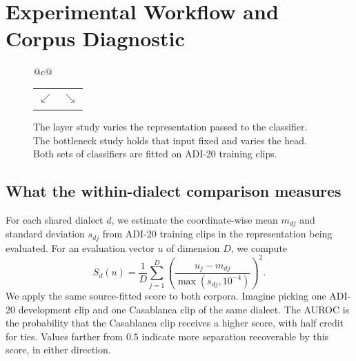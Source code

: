 \documentclass[11pt]{article}
\begin{document}
\clearpage
\section{Experimental Workflow and Corpus Diagnostic}
\label{app:workflow}

\begin{figure}[htbp]
\centering
\setlength{\fboxsep}{7pt}
\setlength{\tabcolsep}{8pt}
\begin{tabular}{@{}c@{}}
  \\[4pt]
  \begin{tabular}{@{}c@{\hspace{0.06\linewidth}}c@{}}
    \(\swarrow\) & \(\searrow\)\\[3pt]
    \fbox{\parbox[t][10.7em][t]{0.40\linewidth}{\centering
      \textbf{Layer study}\\[3pt]
      Individual layers, uniform averages, or learned mixtures\\[3pt]
      \(\downarrow\)\\[2pt]
      Linear classifier\\[3pt]
      \(\downarrow\)\\[2pt]
      ADI-20 dev and balanced Casablanca development
    }}
    &
    \fbox{\parbox[t][10.7em][t]{0.40\linewidth}{\centering
      \textbf{Bottleneck study}\\[3pt]
      Uniform average of blocks 6--18\\[3pt]
      \(\downarrow\)\\[2pt]
      MLP, deterministic, or VIB head\\[3pt]
      \(\downarrow\)\\[2pt]
      ADI-20 dev and full Casablanca development
    }}
  \end{tabular}
\end{tabular}
\caption{The layer study varies the representation passed to the classifier.
The bottleneck study holds that input fixed and varies the head. Both sets of
classifiers are fitted on ADI-20 training clips.}
\label{fig:study-workflow}
\end{figure}

\subsection{What the within-dialect comparison measures}
For each shared dialect \(d\), we estimate the coordinate-wise mean
\(m_{dj}\) and standard deviation \(s_{dj}\) from ADI-20 training clips in
the representation being evaluated. For an evaluation vector \(u\) of
dimension \(D\), we compute
\[
 S_d(u)=\frac{1}{D}\sum_{j=1}^D
 \left(\frac{u_j-m_{dj}}{\max(s_{dj},10^{-4})}\right)^2.
\]
We apply the same source-fitted score to both corpora. Imagine picking
one ADI-20 development clip and one Casablanca clip of the same dialect.
The AUROC is the probability that the Casablanca clip receives a higher
score, with half credit for ties. Values farther from \(0.5\) indicate
more separation recoverable by this score, in either direction.
\end{document}
